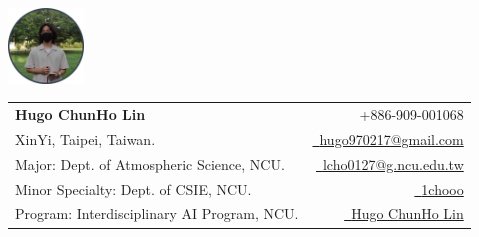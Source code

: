 \documentclass[a4paper,11pt]{article}
\makeatletter
\newcommand{\resumeSubheading}[4]{
\vspace{0.5mm}\item
    \begin{tabular*}{0.98\textwidth}[t]{l@{\extracolsep{\fill}}r}
        \textbf{#1} & \textit{\footnotesize{#4}} \\
        \textit{\footnotesize{#3}} &  \footnotesize{#2}\\
    \end{tabular*}
    \vspace{-2.4mm}
}
\newcommand{\resumeSubHeadingListStart}{\begin{itemize}[leftmargin=*,labelsep=0mm]}
\newcommand{\resumeSubHeadingListEnd}{\end{itemize}\vspace{2mm}}
\newcommand{\name}{Hugo ChunHo Lin} %
\newcommand{\course}{Dept. of Atmospheric Science, NCU.} %
\newcommand{\phone}{909-001068} %
\newcommand{\emaila}{hugo970217@gmail.com} %
\newcommand{\emailb}{lcho0127@g.ncu.edu.tw} %
\makeatother
\begin{document}
\selectfont


\parbox{2.35cm}{%
\includegraphics[width=2cm,clip]{1chooo.png}
}
\parbox{\dimexpr\linewidth-2.8cm\relax}{
\begin{tabularx}{\linewidth}{L r} \\
  \textbf{\Large \name} & {\raisebox{0.0\height}{\footnotesize \faPhone}\ +886-\phone}\\
  XinYi, Taipei, Taiwan. & \href{mailto:\emaila}{\raisebox{0.0\height}{\footnotesize \faEnvelope}\ {\emaila}} \\
  Major: \course &  \href{mailto:\emailb}{\raisebox{0.0\height}{\footnotesize \faEnvelope}\ {\emailb}}\\
  {Minor Specialty: Dept. of CSIE, NCU.} &  \href{https://github.com/1chooo}{\raisebox{0.0\height}{\footnotesize \faGithub}\ {1chooo}} \\
  {Program: Interdisciplinary AI Program, NCU.} & \href{https://www.linkedin.com/in/1chooo/}{\raisebox{0.0\height}{\footnotesize \faLinkedin}\ {Hugo ChunHo Lin}}
\end{tabularx}
}




  
%

\end{document}
